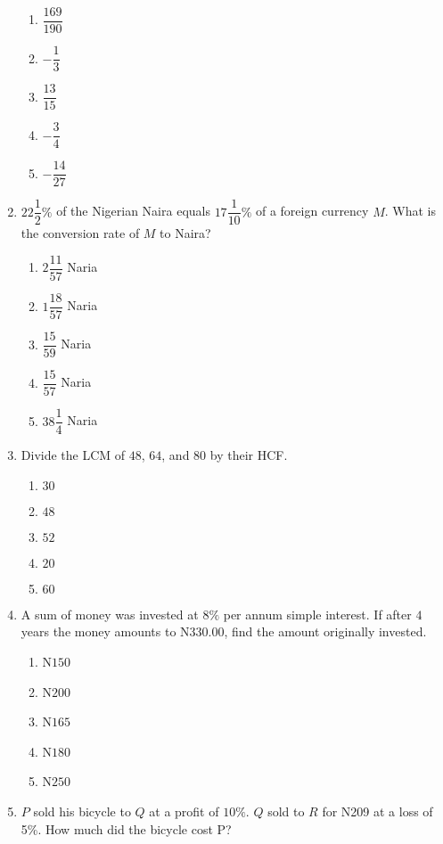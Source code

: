\begin{multicols}{2}
\begin{enumerate}[label={\arabic*.}]
    \begin{enumerate}[label={\Alph*.}]
    \item \(\dfrac{169}{190}\)
    \item \(-\dfrac{1}{3}\)
    \item \(\dfrac{13}{15}\)
    \item \(-\dfrac{3}{4}\)
    \item \(-\dfrac{14}{27}\)
    \end{enumerate}
\item \(22{\dfrac{1}{2}}\%\) of the Nigerian Naira equals \(17{\dfrac{1}{10}}\%\) of a foreign currency \(M\). What is the conversion rate of \(M\) to Naira?
    \begin{enumerate}[label={\Alph*.}]
    \item \(2\dfrac{11}{57}\) Naria
    \item \(1\dfrac{18}{57}\) Naria
    \item \(\dfrac{15}{59}\) Naria
    \item \(\dfrac{15}{57}\) Naria
    \item \(38\dfrac{1}{4}\) Naria
    \end{enumerate}
\item Divide the LCM of \(48\), \(64\), and \(80\) by their HCF.
    \begin{enumerate}[label={\Alph*.}]
    \item \(30\)
    \item \(48\)
    \item \(52\)
    \item \(20\)
    \item \(60\)
    \end{enumerate}
\item A sum of money was invested at \(8\%\) per annum simple interest. If after \(4\) years the money amounts to N330.00, find the amount originally invested.
    \begin{enumerate}[label={\Alph*.}]
    \item N\(150\)
    \item N\(200\)
    \item N\(165\)
    \item N\(180\)
    \item N\(250\)
    \end{enumerate}
\item \(P\) sold his bicycle to \(Q\) at a profit of \(10\%\). \(Q\) sold to \(R\) for N209 at a loss of 5\%. How much did the bicycle cost P? 
    \begin{enumerate}[label={\Alph*.}]

\end{enumerate}
\end{enumerate}
\end{multicols}
